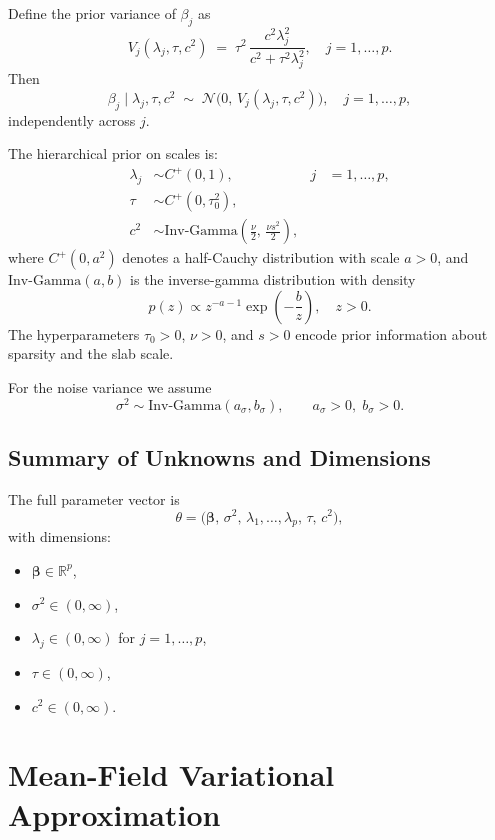 \documentclass[11pt]{article}
\newcommand{\vect}[1]{\boldsymbol{#1}}
\newcommand{\R}{\mathbb{R}}
\newcommand{\IG}{\mathrm{Inv\text{-}Gamma}}
\newcommand{\N}{\mathcal{N}}
\begin{document}
Define the prior variance of $\beta_j$ as
\begin{equation}
  V_j(\lambda_j, \tau, c^2)
  \;=\;
  \tau^2 \,\frac{c^2 \lambda_j^2}{c^2 + \tau^2 \lambda_j^2},
  \quad j = 1,\dots,p.
\end{equation}
Then
\begin{equation}
  \beta_j \mid \lambda_j,\tau,c^2 \;\sim\; \N\big(0,\, V_j(\lambda_j,\tau,c^2)\big),
  \quad j=1,\dots,p,
\end{equation}
independently across $j$.

The hierarchical prior on scales is:
\begin{align}
  \lambda_j &\sim C^+(0,1), 
  & j &= 1,\dots,p, \\
  \tau &\sim C^+(0,\tau_0^2), \\
  c^2 &\sim \IG\!\left(\frac{\nu}{2},\, \frac{\nu s^2}{2}\right),
\end{align}
where $C^+(0,a^2)$ denotes a half-Cauchy distribution with scale $a>0$, and $\IG(a,b)$ is the inverse-gamma distribution with density
\begin{equation}
  p(z) \propto z^{-a-1} \exp\!\left(-\frac{b}{z}\right), \quad z>0.
\end{equation}
The hyperparameters $\tau_0>0$, $\nu>0$, and $s>0$ encode prior information about sparsity and the slab scale.

For the noise variance we assume
\begin{equation}
  \sigma^2 \sim \IG(a_\sigma,b_\sigma), \qquad a_\sigma>0,\; b_\sigma>0.
\end{equation}

\subsection{Summary of Unknowns and Dimensions}

The full parameter vector is
\[
  \theta 
  = \big(\vect{\beta},\, \sigma^2,\, \lambda_1,\dots,\lambda_p,\, \tau,\, c^2\big),
\]
with dimensions:
\begin{itemize}
  \item $\vect{\beta} \in \R^p$,
  \item $\sigma^2 \in (0,\infty)$,
  \item $\lambda_j \in (0,\infty)$ for $j=1,\dots,p$,
  \item $\tau \in (0,\infty)$,
  \item $c^2 \in (0,\infty)$.
\end{itemize}

\section{Mean-Field Variational Approximation}
\end{document}
